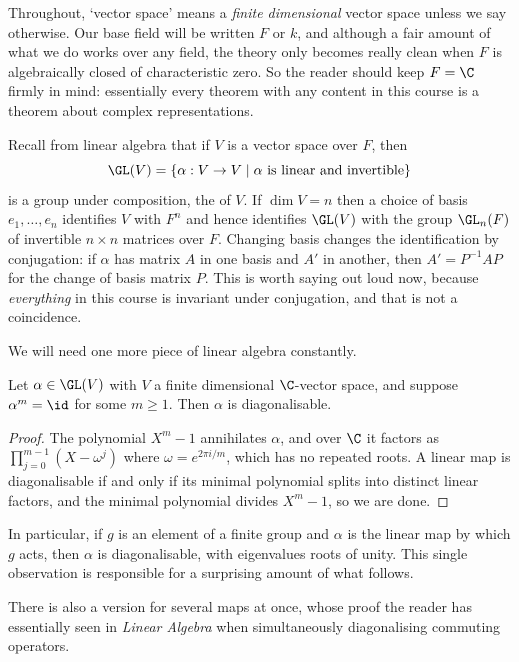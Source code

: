 Throughout, `vector space' means a \emph{finite dimensional} vector space unless we say otherwise. Our base field will be written $F$ or $k$, and although a fair amount of what we do works over any field, the theory only becomes really clean when $F$ is algebraically closed of characteristic zero. So the reader should keep $F = \C$ firmly in mind: essentially every theorem with any content in this course is a theorem about complex representations.

Recall from linear algebra that if $V$ is a vector space over $F$, then
$$\GL(V) = \{ \alpha : V \to V \mid \alpha \text{ is linear and invertible}\}$$
is a group under composition, the  of $V$. If $\dim V = n$ then a choice of basis $e_1, \dots, e_n$ identifies $V$ with $F^n$ and hence identifies $\GL(V)$ with the group $\GL_n(F)$ of invertible $n \times n$ matrices over $F$. Changing basis changes the identification by conjugation: if $\alpha$ has matrix $A$ in one basis and $A'$ in another, then $A' = P^{-1} A P$ for the change of basis matrix $P$. This is worth saying out loud now, because \emph{everything} in this course is invariant under conjugation, and that is not a coincidence.

We will need one more piece of linear algebra constantly.

\begin{proposition}[Diagonalisability]
	Let $\alpha \in \GL(V)$ with $V$ a finite dimensional $\C$-vector space, and suppose $\alpha^m = \id$ for some $m \geq 1$. Then $\alpha$ is diagonalisable.
\end{proposition}
\begin{proof}
	The polynomial $X^m - 1$ annihilates $\alpha$, and over $\C$ it factors as $\prod_{j=0}^{m-1}(X - \omega^j)$ where $\omega = e^{2\pi i/m}$, which has no repeated roots. A linear map is diagonalisable if and only if its minimal polynomial splits into distinct linear factors, and the minimal polynomial divides $X^m - 1$, so we are done.
\end{proof}

In particular, if $g$ is an element of a finite group and $\alpha$ is the linear map by which $g$ acts, then $\alpha$ is diagonalisable, with eigenvalues roots of unity. This single observation is responsible for a surprising amount of what follows.

There is also a version for several maps at once, whose proof the reader has essentially seen in \emph{Linear Algebra} when simultaneously diagonalising commuting operators.

